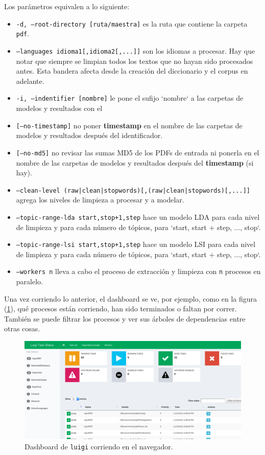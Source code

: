 Los parámetros equivalen a lo siguiente:
\begin{itemize}

\item \texttt{-d, --root-directory [ruta/maestra]} es la ruta que contiene la carpeta \texttt{pdf}.

\item \texttt{--languages idioma1[,idioma2[,...]]} son los idiomas a procesar. Hay que notar que siempre se limpian todos los textos que no hayan sido procesados antes. Esta bandera afecta desde la creación del diccionario y el corpus en adelante.
\item  \texttt{-i, --indentifier [nombre]} le pone el sufijo `nombre` a las carpetas de modelos y resultados con el \item  \texttt{[--no-timestamp]} no poner \textbf{timestamp} en el nombre de las carpetas de modelos y resultados después del identificador.
\item \texttt{[--no-md5]} no revisar las sumas MD5 de los PDFs de entrada ni ponerla en el nombre de las carpetas de modelos y resultados después del \textbf{timestamp} (si hay).
\item \texttt{--clean-level (raw|clean|stopwords)[,(raw|clean|stopwords)[,...]]} agrega los niveles de limpieza a procesar y a modelar.
\item  \texttt{--topic-range-lda start,stop+1,step} hace un modelo LDA para cada nivel de limpieza y para cada número de tópicos, para `start, start + step, ..., stop`.
\item \texttt{--topic-range-lsi start,stop+1,step} hace un modelo LSI para cada nivel de limpieza y para cada número de tópicos, para `start, start + step, ..., stop`.
\item  \texttt{--workers n} lleva a cabo el proceso de extracción y limpieza con \texttt{n} procesos en paralelo.

\end{itemize}

Una vez corriendo lo anterior, el dashboard se ve, por ejemplo, como en la figura (\ref{fig:luigi-dashboard}), qué procesos están corriendo, han sido terminados o faltan por correr. También se puede filtrar los procesos y ver sus árboles de dependencias entre otras cosas.

\begin{figure}[H]
\centering
\includegraphics[width=1\textwidth]{Figures/dashboard.png}
\caption{Dashboard de \texttt{luigi} corriendo en el navegador.\label{fig:luigi-dashboard}}
\end{figure}


